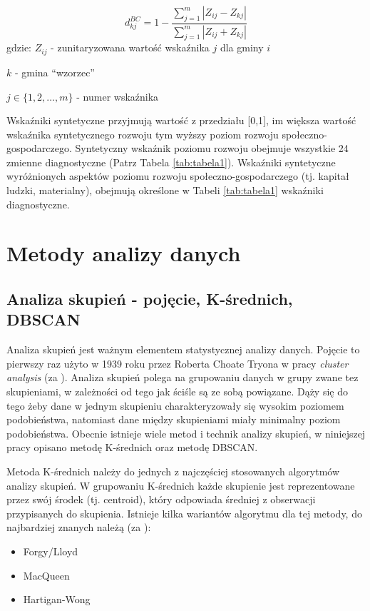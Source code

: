 \documentclass{amuthesis}
\begin{document}
\[ d_{kj}^{BC} = 1 - \frac{ \sum_{j=1}^{m} | Z_{ij} - Z_{kj}| } {\sum_{j=1}^{m} | Z_{ij} + Z_{kj}|  }\]
gdzie:
\(Z_{ij}\) - zunitaryzowana wartość wskaźnika \(j\) dla gminy \(i\)

\(k\) - gmina ``wzorzec''

\(j\in\{1,2,\dots,m\}\) - numer wskaźnika

Wskaźniki syntetyczne przyjmują wartość z przedziału {[}0,1{]}, im większa wartość wskaźnika syntetycznego rozwoju tym wyższy poziom rozwoju społeczno-gospodarczego. Syntetyczny wskaźnik poziomu rozwoju obejmuje wszystkie 24 zmienne diagnostyczne (Patrz Tabela \ref{tab:tabela1}). Wskaźniki syntetyczne wyróżnionych aspektów poziomu rozwoju społeczno-gospodarczego (tj. kapitał ludzki, materialny), obejmują określone w Tabeli \ref{tab:tabela1} wskaźniki diagnostyczne.

\hypertarget{metody}{%
\chapter{Metody analizy danych}\label{metody}}

\hypertarget{skupien}{%
\section{Analiza skupień - pojęcie, K-średnich, DBSCAN}\label{skupien}}

Analiza skupień jest ważnym elementem statystycznej analizy danych.
Pojęcie to pierwszy raz użyto w 1939 roku przez Roberta Choate Tryona w pracy \emph{cluster analysis} (za \textcite{najman}).
Analiza skupień polega na grupowaniu danych w grupy zwane tez skupieniami, w zależności od tego jak ściśle są ze sobą powiązane.
Dąży się do tego żeby dane w jednym skupieniu charakteryzowały się wysokim poziomem podobieństwa, natomiast dane między skupieniami miały minimalny poziom podobieństwa.
Obecnie istnieje wiele metod i technik analizy skupień, w niniejszej pracy opisano metodę K-średnich oraz metodę DBSCAN.

Metoda K-średnich należy do jednych z najczęściej stosowanych algorytmów analizy skupień.
W grupowaniu K-średnich każde skupienie jest reprezentowane przez swój środek (tj. centroid), który odpowiada średniej z obserwacji przypisanych do skupienia.
Istnieje kilka wariantów algorytmu dla tej metody, do najbardziej znanych należą (za \textcite{k-srednich_book}):

\begin{itemize}
\tightlist
\item
  Forgy/Lloyd
\item
  MacQueen
\item
  Hartigan-Wong
\end{itemize}
\end{document}
